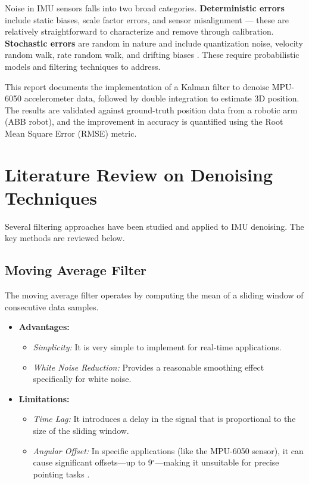 \documentclass[12pt,a4paper]{article}
\begin{document}
Noise in IMU sensors falls into two broad categories. \textbf{Deterministic errors} include static biases, scale factor errors, and sensor misalignment — these are relatively straightforward to characterize and remove through calibration. \textbf{Stochastic errors} are random in nature and include quantization noise, velocity random walk, rate random walk, and drifting biases \cite{nirmala2016}. These require probabilistic models and filtering techniques to address.

This report documents the implementation of a Kalman filter to denoise MPU-6050 accelerometer data, followed by double integration to estimate 3D position. The results are validated against ground-truth position data from a robotic arm (ABB robot), and the improvement in accuracy is quantified using the Root Mean Square Error (RMSE) metric.

\newpage
\section{Literature Review on Denoising Techniques}

Several filtering approaches have been studied and applied to IMU denoising. The key methods are reviewed below.

\subsection{Moving Average Filter}
The moving average filter operates by computing the mean of a sliding window of consecutive data samples.
\begin{itemize}
    \item \textbf{Advantages:}
    \begin{itemize}
        \item \textit{Simplicity:} It is very simple to implement for real-time applications.
        \item \textit{White Noise Reduction:} Provides a reasonable smoothing effect specifically for white noise.
    \end{itemize}
    \item \textbf{Limitations:}
    \begin{itemize}
        \item \textit{Time Lag:} It introduces a delay in the signal that is proportional to the size of the sliding window.
        \item \textit{Angular Offset:} In specific applications (like the MPU-6050 sensor), it can cause significant offsets—up to 9$^\circ$—making it unsuitable for precise pointing tasks \cite{nirmala2016}.
    \end{itemize}
\end{itemize}
\end{document}
